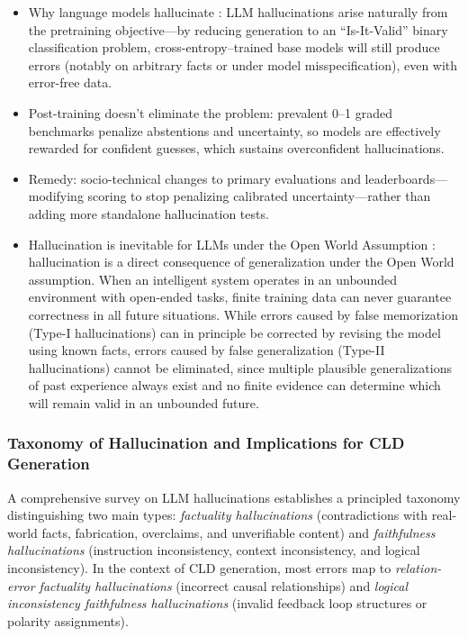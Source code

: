 \documentclass[12pt]{article}
\begin{document}
\begin{itemize}
    \item Why language models hallucinate \cite{kalai2025languagemodelshallucinate}: LLM hallucinations arise naturally from the pretraining objective---by reducing generation to an ``Is-It-Valid'' binary classification problem, cross-entropy--trained base models will still produce errors (notably on arbitrary facts or under model misspecification), even with error-free data.
    \item Post-training doesn't eliminate the problem: prevalent 0--1 graded benchmarks penalize abstentions and uncertainty, so models are effectively rewarded for confident guesses, which sustains overconfident hallucinations.
    \item Remedy: socio-technical changes to primary evaluations and leaderboards---modifying scoring to stop penalizing calibrated uncertainty---rather than adding more standalone hallucination tests.
    \item Hallucination is inevitable for LLMs under the Open World Assumption \cite{xu2025hallucination}: hallucination is a direct consequence of generalization under the Open World assumption. When an intelligent system operates in an unbounded environment with open-ended tasks, finite training data can never guarantee correctness in all future situations. While errors caused by false memorization (Type-I hallucinations) can in principle be corrected by revising the model using known facts, errors caused by false generalization (Type-II hallucinations) cannot be eliminated, since multiple plausible generalizations of past experience always exist and no finite evidence can determine which will remain valid in an unbounded future.
\end{itemize}

\subsubsection{Taxonomy of Hallucination and Implications for CLD Generation}

A comprehensive survey on LLM hallucinations \cite{huang2025hallucination} establishes a principled taxonomy distinguishing two main types: \textit{factuality hallucinations} (contradictions with real-world facts, fabrication, overclaims, and unverifiable content) and \textit{faithfulness hallucinations} (instruction inconsistency, context inconsistency, and logical inconsistency). In the context of CLD generation, most errors map to \textit{relation-error factuality hallucinations} (incorrect causal relationships) and \textit{logical inconsistency faithfulness hallucinations} (invalid feedback loop structures or polarity assignments).
\end{document}
